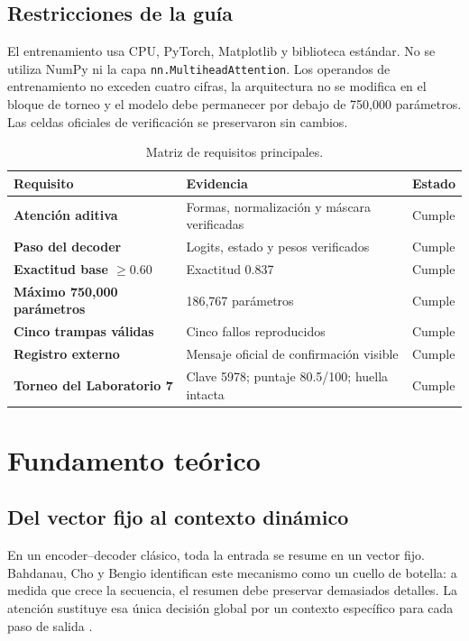 \documentclass[11pt,letterpaper]{article}
\newcommand{\code}[1]{\texttt{#1}}
\begin{document}
\subsection{Restricciones de la guía}

El entrenamiento usa CPU, PyTorch, Matplotlib y biblioteca estándar. No se utiliza NumPy ni la capa
\linebreak\code{nn.MultiheadAttention}. Los operandos de entrenamiento no exceden cuatro cifras, la arquitectura no
se modifica en el bloque de torneo y el modelo debe permanecer por debajo de 750,000 parámetros. Las
celdas oficiales de verificación se preservaron sin cambios.

\begin{table}[H]\centering
\caption{Matriz de requisitos principales.}
\begin{tabularx}{\textwidth}{>{\bfseries}p{}X>{\raggedleft\arraybackslash}p{}}
\toprule Requisito & Evidencia & Estado \\
\midrule
Atención aditiva & Formas, normalización y máscara verificadas & Cumple \\
Paso del decoder & Logits, estado y pesos verificados & Cumple \\
Exactitud base $\geq 0.60$ & Exactitud 0.837 & Cumple \\
Máximo 750,000 parámetros & 186,767 parámetros & Cumple \\
Cinco trampas válidas & Cinco fallos reproducidos & Cumple \\
Registro externo & Mensaje oficial de confirmación visible & Cumple \\
Torneo del Laboratorio 7 & Clave 5978; puntaje 80.5/100; huella intacta & Cumple \\
\bottomrule
\end{tabularx}
\end{table}

\clearpage
\section{Fundamento teórico}

\subsection{Del vector fijo al contexto dinámico}

En un encoder--decoder clásico, toda la entrada se resume en un vector fijo. Bahdanau, Cho y Bengio
identifican este mecanismo como un cuello de botella: a medida que crece la secuencia, el resumen debe
preservar demasiados detalles. La atención sustituye esa única decisión global por un contexto específico
para cada paso de salida \cite{bahdanau2014}.
\end{document}
